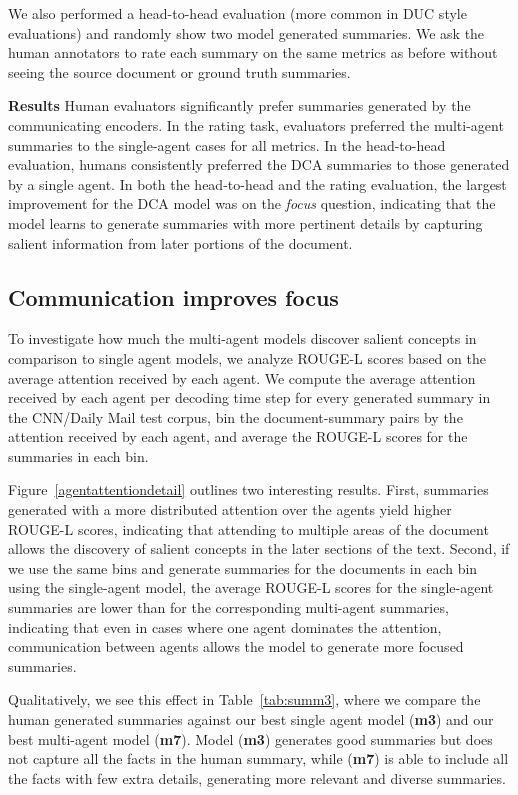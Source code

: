 \documentclass[11pt,a4paper]{article}
\begin{document}
We also performed a head-to-head evaluation (more common in DUC style evaluations) and randomly show two model generated summaries. We ask the human annotators to rate each summary on the same metrics as before without seeing the source document or ground truth summaries. 

\noindent\textbf{Results} Human evaluators significantly prefer summaries generated by the communicating encoders. In the rating task, evaluators preferred the multi-agent summaries to the single-agent cases for all metrics.  
In the head-to-head evaluation, humans consistently preferred the DCA summaries to those generated by a single agent. In both the head-to-head and the rating evaluation, the largest improvement for the DCA model was on the \textit{focus} question, indicating that the model learns to generate summaries with more pertinent details by capturing salient information from later portions of the document. 

\subsection{Communication improves focus}
To investigate how much the multi-agent models discover salient concepts in comparison to single agent models, we analyze ROUGE-L scores based on the average attention received by each agent. We compute the average attention received by each agent per decoding time step for every generated summary in the CNN/Daily Mail test corpus, bin the document-summary pairs by the attention received by each agent, and average the ROUGE-L scores for the summaries in each bin.

Figure~\ref{agentattentiondetail} outlines two interesting results. First, summaries generated with a more distributed attention over the agents yield higher ROUGE-L scores, indicating that attending to multiple areas of the document allows the discovery of salient concepts in the later sections of the text. Second, if we use the same bins and generate summaries for the documents in each bin using the single-agent model, the average ROUGE-L scores for the single-agent summaries are lower than for the corresponding multi-agent summaries, indicating that even in cases where one agent dominates the attention, communication between agents allows the model to generate more focused summaries.

Qualitatively, we see this effect in Table~\ref{tab:summ3}, where we compare the human generated summaries against our best single agent model (\textbf{m3}) and our best multi-agent model (\textbf{m7}). Model (\textbf{m3}) generates good summaries but does not capture all the facts in the human summary, while (\textbf{m7}) is able to include all the facts with few extra details, generating more relevant and diverse summaries. 
\end{document}
